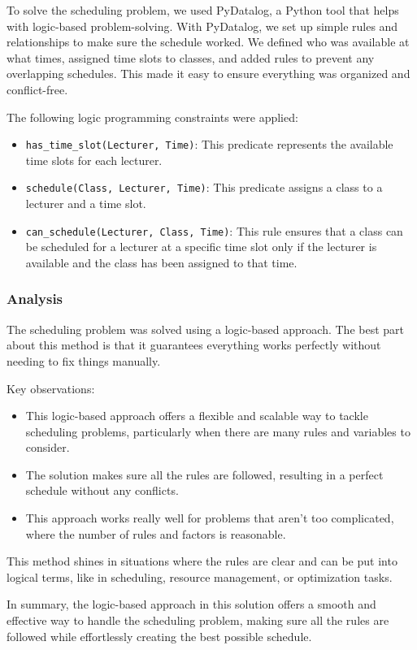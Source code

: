 \documentclass[12pt]{article}
\begin{document}
To solve the scheduling problem, we used PyDatalog, a Python tool that helps with logic-based problem-solving. With PyDatalog, we set up simple rules and relationships to make sure the schedule worked. We defined who was available at what times, assigned time slots to classes, and added rules to prevent any overlapping schedules. This made it easy to ensure everything was organized and conflict-free.

The following logic programming constraints were applied:

\begin{itemize}
    \item \texttt{has\_time\_slot(Lecturer, Time)}: This predicate represents the available time slots for each lecturer.
    \item \texttt{schedule(Class, Lecturer, Time)}: This predicate assigns a class to a lecturer and a time slot.
    \item \texttt{can\_schedule(Lecturer, Class, Time)}: This rule ensures that a class can be scheduled for a lecturer at a specific time slot only if the lecturer is available and the class has been assigned to that time.
\end{itemize}
\subsubsection{Analysis}
The scheduling problem was solved using a logic-based approach. The best part about this method is that it guarantees everything works perfectly without needing to fix things manually.

Key observations:

\begin{itemize}
    \item This logic-based approach offers a flexible and scalable way to tackle scheduling problems, particularly when there are many rules and variables to consider.
    \item The solution makes sure all the rules are followed, resulting in a perfect schedule without any conflicts.
    \item This approach works really well for problems that aren't too complicated, where the number of rules and factors is reasonable.
\end{itemize}

This method shines in situations where the rules are clear and can be put into logical terms, like in scheduling, resource management, or optimization tasks.

In summary, the logic-based approach in this solution offers a smooth and effective way to handle the scheduling problem, making sure all the rules are followed while effortlessly creating the best possible schedule.
\end{document}
